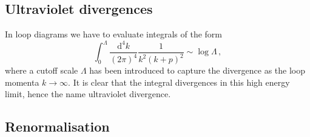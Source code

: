 \documentclass[main.tex]{subfiles}
\begin{document}
\subsection{Ultraviolet divergences}
    In loop diagrams we have to evaluate integrals of the form
    \begin{equation}
        \int_{0}^{\Lambda} \dfrac{\mathrm{d}^{4}k}{(2\pi)^{4}}\dfrac{1}{k^{2}(k+p)^{2}} \sim \log{\Lambda} \, ,
    \end{equation}
    where a cutoff scale $\Lambda$ has been introduced to
    capture the divergence as the loop momenta
    $k \rightarrow \infty$. It is clear that the
    integral divergences in this high energy limit,
    hence the name ultraviolet divergence.
\subsection{Renormalisation}
\end{document}
